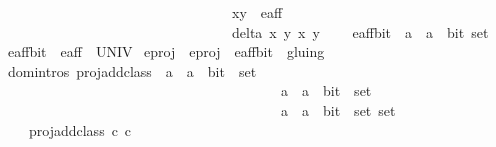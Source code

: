 \begin{isabellebody}
\ \ \ \ \ \ \ \ \ \ \ \ \ \ \ \ \ \ \ \ \ \ \ \ \ \ \ \ \ \ \ \ \ {\isacharparenleft}x{}{\isacharcomma}y{}{\isacharparenright}\ {\isasymin}\ e{\isacharprime}{\isacharunderscore}aff\ {\isasymand}\ \isanewline
\ \ \ \ \ \ \ \ \ \ \ \ \ \ \ \ \ \ \ \ \ \ \ \ \ \ \ \ \ \ \ \ \ delta{\isacharprime}\ x{}\ y{}\ x{}\ y{}\ {\isasymnoteq}\ {}\ {\isacharbraceright}{\isachardoublequoteclose}\isanewline
\isanewline
{}\isamarkupfalse%
\ e{\isacharprime}{\isacharunderscore}aff{\isacharunderscore}bit\ {\isacharcolon}{\isacharcolon}\ {\isachardoublequoteopen}{\isacharparenleft}{\isacharparenleft}{\isacharprime}a\ {\isasymtimes}\ {\isacharprime}a{\isacharparenright}\ {\isasymtimes}\ bit{\isacharparenright}\ set{\isachardoublequoteclose}\ \isanewline
\ {\isachardoublequoteopen}e{\isacharprime}{\isacharunderscore}aff{\isacharunderscore}bit\ {\isacharequal}\ e{\isacharprime}{\isacharunderscore}aff\ {\isasymtimes}\ UNIV{\isachardoublequoteclose}\isanewline
\isanewline
\isanewline
{}\isamarkupfalse%
\ e{\isacharunderscore}proj\ \ {\isachardoublequoteopen}e{\isacharunderscore}proj\ {\isacharequal}\ e{\isacharprime}{\isacharunderscore}aff{\isacharunderscore}bit\ {\isacharslash}{\isacharslash}\ gluing{\isachardoublequoteclose}\isanewline
\isanewline
\isanewline
{}\isamarkupfalse%
\ {\isacharparenleft}domintros{\isacharparenright}\ proj{\isacharunderscore}add{\isacharunderscore}class\ {\isacharcolon}{\isacharcolon}\ {\isachardoublequoteopen}{\isacharparenleft}{\isacharparenleft}{\isacharprime}a\ {\isasymtimes}\ {\isacharprime}a{\isacharparenright}\ {\isasymtimes}\ bit\ {\isacharparenright}\ set\ {\isasymRightarrow}\isanewline
\ \ \ \ \ \ \ \ \ \ \ \ \ \ \ \ \ \ \ \ \ \ \ \ \ \ \ \ \ \ \ \ \ \ \ \ \ \ \ \ {\isacharparenleft}{\isacharparenleft}{\isacharprime}a\ {\isasymtimes}\ {\isacharprime}a{\isacharparenright}\ {\isasymtimes}\ bit\ {\isacharparenright}\ set\ {\isasymRightarrow}\ \isanewline
\ \ \ \ \ \ \ \ \ \ \ \ \ \ \ \ \ \ \ \ \ \ \ \ \ \ \ \ \ \ \ \ \ \ \ \ \ \ \ \ {\isacharparenleft}{\isacharparenleft}{\isacharparenleft}{\isacharprime}a\ {\isasymtimes}\ {\isacharprime}a{\isacharparenright}\ {\isasymtimes}\ bit\ {\isacharparenright}\ set{\isacharparenright}\ set{\isachardoublequoteclose}\isanewline
\ \ \ \isanewline
\ \ \ \ {\isachardoublequoteopen}proj{\isacharunderscore}add{\isacharunderscore}class\ c{}\ c{}\ {\isacharequal}\ \isanewline
\ \ \ \ \ \ \ \ {\isacharparenleft}\isanewline

\end{isabellebody}

